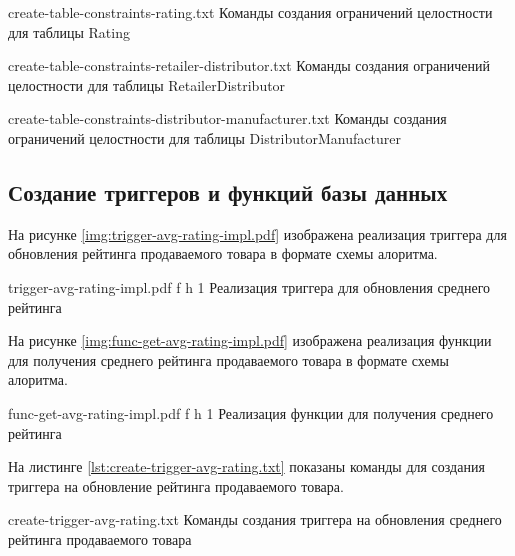 {create-table-constraints-rating.txt} %
{Команды создания ограничений целостности для таблицы Rating} %

\clearpage

{create-table-constraints-retailer-distributor.txt} %
{Команды создания ограничений целостности для таблицы RetailerDistributor} %

{create-table-constraints-distributor-manufacturer.txt} %
{Команды создания ограничений целостности для таблицы DistributorManufacturer} %

\clearpage

\subsection{Создание триггеров и функций базы данных}

На рисунке \ref{img:trigger-avg-rating-impl.pdf} изображена реализация триггера для обновления рейтинга продаваемого товара в формате схемы алоритма.

{trigger-avg-rating-impl.pdf} %
{f} %
{h} %
{1\textwidth} %
{Реализация триггера для обновления среднего рейтинга} %

\clearpage

На рисунке \ref{img:func-get-avg-rating-impl.pdf} изображена реализация функции для получения среднего рейтинга продаваемого товара в формате схемы алоритма.

{func-get-avg-rating-impl.pdf} %
{f} %
{h} %
{1\textwidth} %
{Реализация функции для получения среднего рейтинга} %

На листинге \ref{lst:create-trigger-avg-rating.txt} показаны команды для создания триггера на обновление рейтинга продаваемого товара.

{create-trigger-avg-rating.txt} %
{Команды создания триггера на обновления среднего рейтинга продаваемого товара} %

